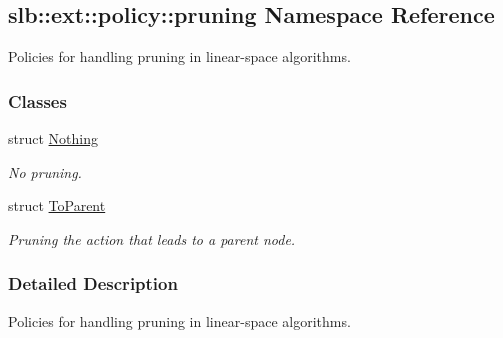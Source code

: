 \hypertarget{namespaceslb_1_1ext_1_1policy_1_1pruning}{}\subsection{slb\+:\+:ext\+:\+:policy\+:\+:pruning Namespace Reference}
\label{namespaceslb_1_1ext_1_1policy_1_1pruning}


Policies for handling pruning in linear-\/space algorithms.  


\subsubsection*{Classes}
\begin{DoxyCompactItemize}
\item 
struct \hyperlink{structslb_1_1ext_1_1policy_1_1pruning_1_1Nothing}{Nothing}
\begin{DoxyCompactList}\small\item\em No pruning. \end{DoxyCompactList}\item 
struct \hyperlink{structslb_1_1ext_1_1policy_1_1pruning_1_1ToParent}{To\+Parent}
\begin{DoxyCompactList}\small\item\em Pruning the action that leads to a parent node. \end{DoxyCompactList}\end{DoxyCompactItemize}


\subsubsection{Detailed Description}
Policies for handling pruning in linear-\/space algorithms. 